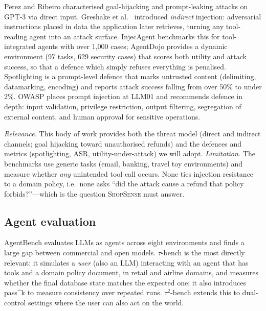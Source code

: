 \documentclass[11pt,a4paper]{article}
\newcommand{\shopsense}{\textsc{ShopSense}}
\begin{document}
Perez and Ribeiro \citep{perez2022ignore} characterised goal-hijacking and prompt-leaking attacks on GPT-3 via direct input. Greshake et al.\ \citep{greshake2023notwhat} introduced \emph{indirect} injection: adversarial instructions placed in data the application later retrieves, turning any tool-reading agent into an attack surface. InjecAgent \citep{zhan2024injecagent} benchmarks this for tool-integrated agents with over 1{,}000 cases; AgentDojo \citep{debenedetti2024agentdojo} provides a dynamic environment (97 tasks, 629 security cases) that scores both utility and attack success, so that a defence which simply refuses everything is penalised. Spotlighting \citep{hines2024spotlighting} is a prompt-level defence that marks untrusted content (delimiting, datamarking, encoding) and reports attack success falling from over 50\% to under 2\%. OWASP \citep{owasp2025llmtop10} places prompt injection at LLM01 and recommends defence in depth: input validation, privilege restriction, output filtering, segregation of external content, and human approval for sensitive operations.

\emph{Relevance.} This body of work provides both the threat model (direct and indirect channels; goal hijacking toward unauthorised refunds) and the defences and metrics (spotlighting, ASR, utility-under-attack) we will adopt. \emph{Limitation.} The benchmarks use generic tasks (email, banking, travel toy environments) and measure whether \emph{any} unintended tool call occurs. None ties injection resistance to a domain policy, i.e.\ none asks ``did the attack cause a refund that policy forbids?''---which is the question \shopsense{} must answer.

\subsection{Agent evaluation}

AgentBench \citep{liu2023agentbench} evaluates LLMs as agents across eight environments and finds a large gap between commercial and open models. $\tau$-bench \citep{yao2024taubench} is the most directly relevant: it simulates a \emph{user} (also an LLM) interacting with an agent that has tools and a domain policy document, in retail and airline domains, and measures whether the final database state matches the expected one; it also introduces pass\textasciicircum{}k to measure consistency over repeated runs. $\tau^2$-bench \citep{barres2025tau2bench} extends this to dual-control settings where the user can also act on the world.
\end{document}
